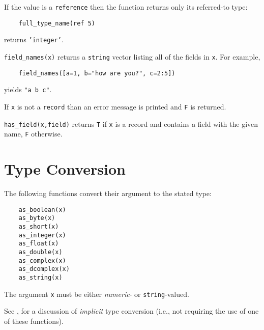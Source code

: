 \begin{list}{}{}
If the value is a {\tt reference} then the function returns only its
referred-to type:
\begin{verbatim}
    full_type_name(ref 5)
\end{verbatim}
returns {\tt 'integer'}.

\item[{\tt field\_names(x)}] \label{field_names-func} 
returns a {\tt string} vector listing all
of the fields in {\tt x}.  For example,
\begin{verbatim}
    field_names([a=1, b="how are you?", c=2:5])
\end{verbatim}
yields {\tt "a b c"}.

If {\tt x} is not a {\tt record} than an error message is printed and
{\tt F} is returned.

\item[{\tt has\_field(x,field)}] \label{has_field-func} 
returns {\tt T} if {\tt x} is a record
and contains a field with the given name, {\tt F} otherwise.

\end{list}

\section{Type Conversion}
\label{predefineds-conversion}

The following functions convert their argument to the stated type:
\begin{verbatim}
    as_boolean(x)
    as_byte(x)
    as_short(x)
    as_integer(x)
    as_float(x)
    as_double(x)
    as_complex(x)
    as_dcomplex(x)
    as_string(x)
\end{verbatim}
\label{as_boolean-func}
\label{as_byte-func}
\label{as_short-func}
\label{as_integer-func}
\label{as_float-func}
\label{as_double-func}
\label{as_complex-func}
\label{as_dcomplex-func}
\label{as_string-func}
The argument {\tt x} must be either {\em numeric}- or {\tt string}-valued.

See , for a discussion of {\em implicit} type
conversion (i.e., not requiring the use of one of these functions).

